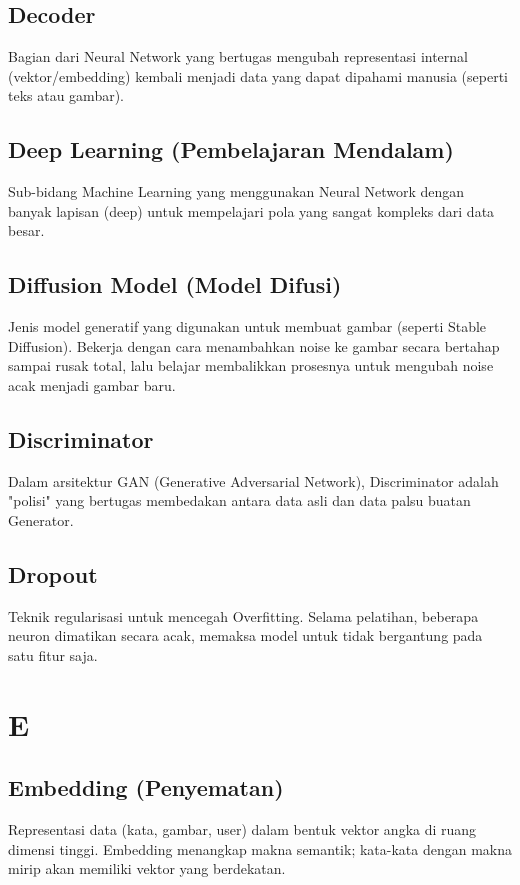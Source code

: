 \subsection*{Decoder}
Bagian dari Neural Network yang bertugas mengubah representasi internal (vektor/embedding) kembali menjadi data yang dapat dipahami manusia (seperti teks atau gambar).

\subsection*{Deep Learning (Pembelajaran Mendalam)}
Sub-bidang Machine Learning yang menggunakan Neural Network dengan banyak lapisan (deep) untuk mempelajari pola yang sangat kompleks dari data besar.

\subsection*{Diffusion Model (Model Difusi)}
Jenis model generatif yang digunakan untuk membuat gambar (seperti Stable Diffusion). Bekerja dengan cara menambahkan noise ke gambar secara bertahap sampai rusak total, lalu belajar membalikkan prosesnya untuk mengubah noise acak menjadi gambar baru.

\subsection*{Discriminator}
Dalam arsitektur GAN (Generative Adversarial Network), Discriminator adalah "polisi" yang bertugas membedakan antara data asli dan data palsu buatan Generator.

\subsection*{Dropout}
Teknik regularisasi untuk mencegah Overfitting. Selama pelatihan, beberapa neuron dimatikan secara acak, memaksa model untuk tidak bergantung pada satu fitur saja.

\section*{E}

\subsection*{Embedding (Penyematan)}
Representasi data (kata, gambar, user) dalam bentuk vektor angka di ruang dimensi tinggi. Embedding menangkap makna semantik; kata-kata dengan makna mirip akan memiliki vektor yang berdekatan.

